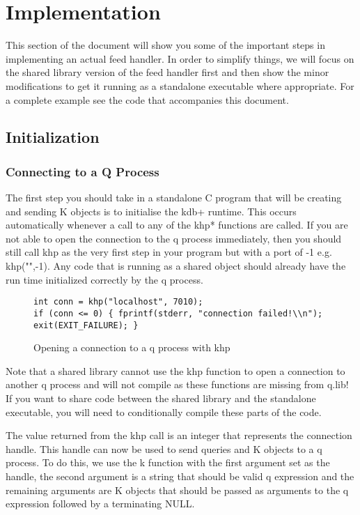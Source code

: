 \chapter{Implementation}

This section of the document will show you some of the important steps in implementing an actual
feed handler. In order to simplify things, we will focus on the shared library version of the feed
handler first and then show the minor modifications to get it running as a standalone executable
where appropriate. For a complete example see the code that accompanies this document.

\section{Initialization}

\subsection{Connecting to a Q Process}

The first step you should take in a standalone C program that will be creating and sending K objects
is to initialise the kdb+ runtime. This occurs automatically whenever a call to any of the khp* functions
are called. If you are not able to open the connection to the q process immediately, then you should still
call khp as the very first step in your program but with a port of -1 e.g. khp("",-1). Any code that is
running as a shared object should already have the run time initialized correctly by the q process.

\begin{figure}
\begin{lstlisting}
int conn = khp("localhost", 7010);
if (conn <= 0) { fprintf(stderr, "connection failed!\\n"); exit(EXIT_FAILURE); }
\end{lstlisting}
\caption{Opening a connection to a q process with khp}
\end{figure}

Note that a shared library cannot use the khp function to open a connection to another q process and
will not compile as these functions are missing from q.lib! If you want to share code between the shared
library and the standalone executable, you will need to conditionally compile these parts of the code.

The value returned from the khp call is an integer that represents the connection handle. This handle
can now be used to send queries and K objects to a q process. To do this, we use the k function with
the first argument set as the handle, the second argument is a string that should be valid q expression
and the remaining arguments are K objects that should be passed as arguments to the q expression followed
by a terminating NULL.


